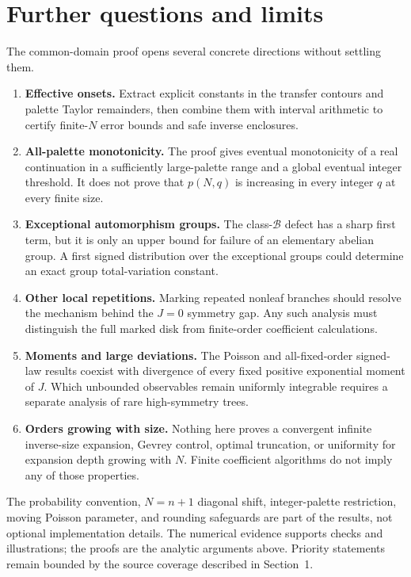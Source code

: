 \documentclass[11pt]{article}
\theoremstyle{definition}
\newcommand{\classB}{\mathcal B}
\begin{document}
\section{Further questions and limits}\label{mct:sec:questions}
The common-domain proof opens several concrete directions without settling them.
\begin{enumerate}
\item \textbf{Effective onsets.} Extract explicit constants in the transfer contours and palette Taylor remainders, then combine them with interval arithmetic to certify finite-$N$ error bounds and safe inverse enclosures.
\item \textbf{All-palette monotonicity.} The proof gives eventual monotonicity of a real continuation in a sufficiently large-palette range and a global eventual integer threshold. It does not prove that $p(N,q)$ is increasing in every integer $q$ at every finite size.
\item \textbf{Exceptional automorphism groups.} The class-$\classB$ defect has a sharp first term, but it is only an upper bound for failure of an elementary abelian group. A first signed distribution over the exceptional groups could determine an exact group total-variation constant.
\item \textbf{Other local repetitions.} Marking repeated nonleaf branches should resolve the mechanism behind the $J=0$ symmetry gap. Any such analysis must distinguish the full marked disk from finite-order coefficient calculations.
\item \textbf{Moments and large deviations.} The Poisson and all-fixed-order signed-law results coexist with divergence of every fixed positive exponential moment of $J$. Which unbounded observables remain uniformly integrable requires a separate analysis of rare high-symmetry trees.
\item \textbf{Orders growing with size.} Nothing here proves a convergent infinite inverse-size expansion, Gevrey control, optimal truncation, or uniformity for expansion depth growing with $N$. Finite coefficient algorithms do not imply any of those properties.
\end{enumerate}
The probability convention, $N=n+1$ diagonal shift, integer-palette restriction, moving Poisson parameter, and rounding safeguards are part of the results, not optional implementation details. The numerical evidence supports checks and illustrations; the proofs are the analytic arguments above. Priority statements remain bounded by the source coverage described in Section~1.
\end{document}
